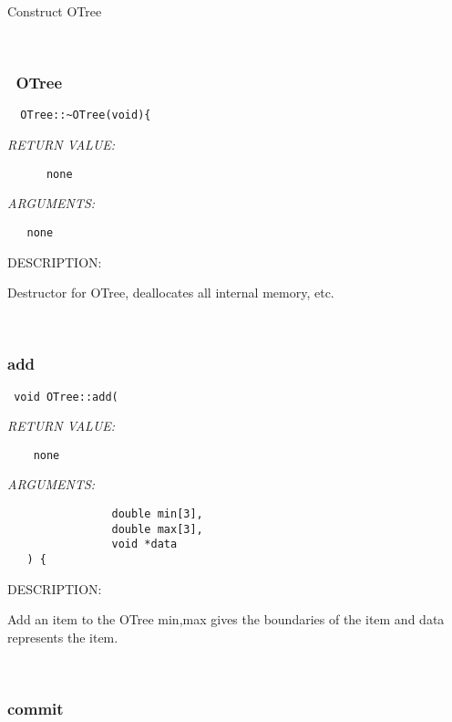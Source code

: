      Construct OTree 
 
\mbox{}\hrulefill\
 
\subsubsection [~OTree] {~OTree}


  
\begin{verbatim}  OTree::~OTree(void){\end{verbatim}{\em RETURN VALUE:}
\begin{verbatim}      none\end{verbatim}{\em ARGUMENTS:}
\begin{verbatim}   none\end{verbatim}
{\sf DESCRIPTION:\\ }


    Destructor for OTree, deallocates all internal memory, etc.
   
 
\mbox{}\hrulefill\ 
 
\subsubsection [add] {add}


  
\begin{verbatim} void OTree::add(
 \end{verbatim}{\em RETURN VALUE:}
\begin{verbatim}    none\end{verbatim}{\em ARGUMENTS:}
\begin{verbatim}                double min[3],
                double max[3],
                void *data
   ) {\end{verbatim}
{\sf DESCRIPTION:\\ }


   Add an item to the OTree min,max gives the boundaries of the item and data
   represents the item. 
 
\mbox{}\hrulefill\ 
 
\subsubsection [commit] {commit}


